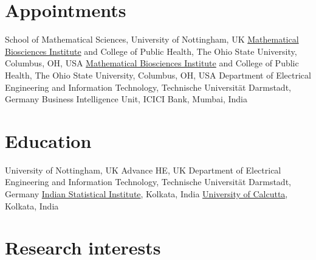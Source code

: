 \documentclass[11pt,a4paper]{article}
\begin{document}

\section{Appointments}

  {School of Mathematical Sciences, University of Nottingham, UK}
  {\href{https://mbi.osu.edu/}{Mathematical Biosciences Institute} and College of Public Health, The Ohio State University, Columbus, OH, USA}
  {\href{https://mbi.osu.edu/}{Mathematical Biosciences Institute} and College of Public Health, The Ohio State University, Columbus, OH, USA}
  {Department of Electrical Engineering and Information Technology, Technische Universität Darmstadt, Germany}
  {Business Intelligence Unit, ICICI Bank, Mumbai, India}

\section{Education}

  {University of Nottingham, UK}
  {Advance HE, UK}
  {Department of Electrical Engineering and Information Technology, Technische Universität Darmstadt, Germany}
  {\href{https://www.isical.ac.in/}{Indian Statistical Institute}, Kolkata, India}
  {\href{https://www.caluniv.ac.in/}{University of Calcutta}, Kolkata, India}

\section{Research interests}
\end{document}
